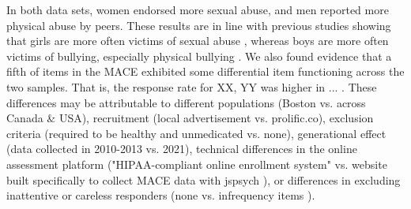 \documentclass[letterpaper,man,natbib]{apa6}  %
\begin{document}



In both data sets, women endorsed more sexual abuse, and men reported more physical abuse by peers. These results are in line with previous studies showing that girls are more often victims of sexual abuse \citep{stoltenborgh2015prevalence}, whereas boys are more often victims of bullying, especially physical bullying \citep{scheithauer2006physical}. We also found evidence that a fifth of items in the MACE exhibited some differential item functioning across the two samples. That is, the response rate for XX, YY was higher in ... . These differences may be attributable to different populations (Boston vs. across Canada \& USA), recruitment (local advertisement vs. prolific.co), exclusion criteria (required to be healthy and unmedicated vs. none), generational effect (data collected in 2010-2013 vs. 2021), technical differences in the online assessment platform ("HIPAA-compliant online enrollment system" vs. website built specifically to collect MACE data with jspsych \citep{de2015jspsych}), or differences in excluding inattentive or careless responders (none vs. infrequency items \citep{zorowitz2021inattentive}). 


\end{document}
